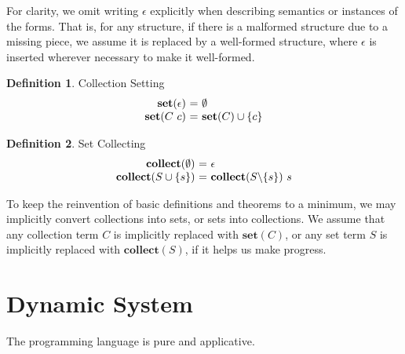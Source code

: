 \documentclass[acmsmall]{acmart}
\theoremstyle{definition}
\newtheorem{definition}{Definition}[section]
\begin{document}
For clarity, we omit writing $\epsilon$ explicitly when describing semantics or instances of the forms.
That is, for any structure, if there is a malformed structure due to a missing piece, 
we assume it is replaced by a well-formed structure, 
where $\epsilon$ is inserted wherever necessary to make it well-formed.


\begin{definition} 
  \label{def:collection_Setting}
  Collection Setting 
  \hfill 
  \\
  \[
  \begin{array}[t]{r@{}c@{}l}
      \textbf{set}(\epsilon)
      &\ =\ & 
      \emptyset 

      \\

      \textbf{set}(C\ c)
      &\ =\ & 
      \textbf{set}(C) \cup \{ c \} 
  \end{array}
  \]
\end{definition} 

\begin{definition} 
  \label{def:set_collecting}
  Set Collecting 
  \hfill 
  \\
  \[
  \begin{array}[t]{r@{}c@{}l}
      \textbf{collect}(\emptyset)
      &\ =\ & 
      \epsilon 

      \\

      \textbf{collect}(S \cup \{s\})
      &\ =\ & 
      \textbf{collect}(S \backslash \{s\})\ s 
  \end{array}
  \]
\end{definition} 

\noindent
To keep the reinvention of basic definitions and theorems to a minimum, 
we may implicitly convert collections into sets, or sets into collections.
We assume that any collection term $C$ is implicitly replaced with $\textbf{set}(C)$,
or any set term $S$ is implicitly replaced with $\textbf{collect}(S)$, if it helps
us make progress.


\section{Dynamic System}
\label{sec:dynamic_system}

The programming language is pure and applicative. 
\end{document}
